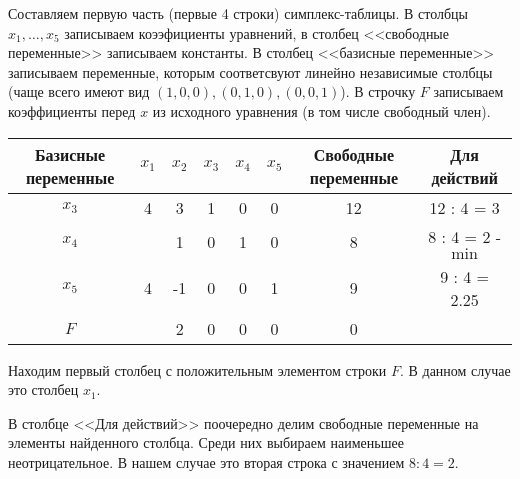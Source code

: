 \begin{example}
\begin{solution}
	Составляем первую часть (первые 4 строки) симплекс-таблицы. В столбцы $x_1,\dots,x_5$ записываем коээфициенты уравнений, в столбец <<свободные переменные>> записываем константы. В столбец <<базисные переменные>> записываем переменные, которым соответсвуют линейно независимые столбцы (чаще всего имеют вид $(1,0,0), (0,1,0), (0,0,1)$). В строчку $F$ записываем коэффициенты перед $x$ из исходного уравнения (в том числе свободный член).
	\begin{table}[H]
		\centering
		\begin{tabular}{|c|c|c|c|c|c|c|c|}
			\hline
			Базисные переменные & $x_1$ & $x_2$ & $x_3$ & $x_4$ & $x_5$ & Свободные переменные & Для действий \\ \hline
			$x_3$ & 4 & 3 & 1 & 0 & 0 & 12 & 12 : 4 = 3 \\
			$x_4$ & \boxed{4} & 1  & 0 & 1 & 0 & 8  & 8 : 4 = 2 - $\min$ \\
			$x_5$ & 4 & -1 & 0 & 0 & 1 & 9  & 9 : 4 = 2.25 \\ \hline
			$F$   & \boxed{3} & 2  & 0 & 0 & 0 & 0 & \\ \hline
		\end{tabular}
	\end{table}
	
	Находим первый столбец с положительным элементом строки $F$. В данном случае это столбец $x_1$. 
	
	В столбце <<Для действий>> поочередно делим свободные переменные на элементы найденного столбца. Среди них выбираем наименьшее неотрицательное. В нашем случае это вторая строка с значением $8:4=2$.
	

\end{solution}
\end{example}
